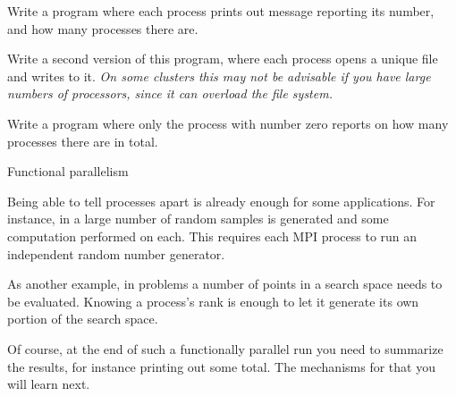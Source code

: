\begin{exercise}
  \label{ex:hello3}
  Write a program where each process prints out message
  reporting its number, and how many processes there are.

  Write a second version of this program, where each process opens a
  unique file and writes to it. \emph{On some clusters this may not be
    advisable if you have large numbers of processors, since it can
    overload the file system.}
\end{exercise}

\begin{exercise}
  \label{ex:hello4}
  Write a program where only the process with number zero
  reports on how many processes there are in total.
\end{exercise}

 {Functional parallelism}

Being able to tell processes apart is already enough for some applications.
For instance, in  a large number of random samples
is generated and some computation performed on each. This requires each MPI
process to run an independent random number generator.

As another example, in  problems
a number of points in a search space needs to be evaluated. Knowing
a process's rank is enough to let it generate its own portion of the search space.

Of course, at the end of such a functionally parallel run you need to
summarize the results, for instance printing out some total.
The mechanisms for that you will learn next.

%

